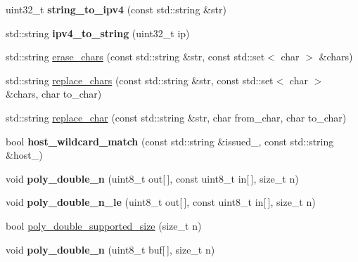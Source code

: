 \begin{DoxyCompactItemize}
\mbox{\label{namespace_botan_a2cf1791d95dced481a307040ea39ddf5}} 
uint32\+\_\+t {\bfseries string\+\_\+to\+\_\+ipv4} (const std\+::string \&str)
\item 
\mbox{\label{namespace_botan_acf0b80d2876f40365dcf5f8d6538aaeb}} 
std\+::string {\bfseries ipv4\+\_\+to\+\_\+string} (uint32\+\_\+t ip)
\item 
std\+::string \mbox{\hyperlink{namespace_botan_a27c25f0333e84e5540be288b4298b766}{erase\+\_\+chars}} (const std\+::string \&str, const std\+::set$<$ char $>$ \&chars)
\item 
std\+::string \mbox{\hyperlink{namespace_botan_a64033c1b7127eae1491a8eadd11d1ecb}{replace\+\_\+chars}} (const std\+::string \&str, const std\+::set$<$ char $>$ \&chars, char to\+\_\+char)
\item 
std\+::string \mbox{\hyperlink{namespace_botan_a292061a5124df501cb59c2f899f78235}{replace\+\_\+char}} (const std\+::string \&str, char from\+\_\+char, char to\+\_\+char)
\item 
\mbox{\label{namespace_botan_ae91221a7e967f5c50667b8a2ba06971f}} 
bool {\bfseries host\+\_\+wildcard\+\_\+match} (const std\+::string \&issued\+\_\+, const std\+::string \&host\+\_\+)
\item 
\mbox{\label{namespace_botan_a7e26a43fb6d797b11b9ef9f8e9721c01}} 
void {\bfseries poly\+\_\+double\+\_\+n} (uint8\+\_\+t out\mbox{[}$\,$\mbox{]}, const uint8\+\_\+t in\mbox{[}$\,$\mbox{]}, size\+\_\+t n)
\item 
\mbox{\label{namespace_botan_a3db9fae4308d34b2bc1060f839cbcab3}} 
void {\bfseries poly\+\_\+double\+\_\+n\+\_\+le} (uint8\+\_\+t out\mbox{[}$\,$\mbox{]}, const uint8\+\_\+t in\mbox{[}$\,$\mbox{]}, size\+\_\+t n)
\item 
bool \mbox{\hyperlink{namespace_botan_ae10f56ac44d39dac92ae756ff4c26510}{poly\+\_\+double\+\_\+supported\+\_\+size}} (size\+\_\+t n)
\item 
\mbox{\label{namespace_botan_a153cab9476e6f8df0c39e63260293c69}} 
void {\bfseries poly\+\_\+double\+\_\+n} (uint8\+\_\+t buf\mbox{[}$\,$\mbox{]}, size\+\_\+t n)
\item 
\mbox{\label{namespace_botan_ac98d079fc4312757f211acddb232e331}} 

\end{DoxyCompactItemize}
